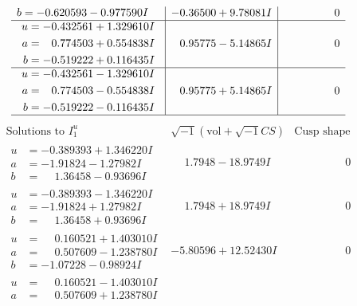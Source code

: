 \documentclass[1p]{elsarticle_modified}
\theoremstyle{definition}
\newcommand{\I}{\sqrt{-1}}
\begin{document}
$$\begin{array}{c|c|c}
\begin{aligned}
b &= -0.620593 - 0.977590 I\end{aligned}
 & -0.36500 + 9.78081 I & \phantom{-0.000000 } 0 \\ \hline\begin{aligned}
u &= -0.432561 + 1.329610 I \\
a &= \phantom{-}0.774503 + 0.554838 I \\
b &= -0.519222 + 0.116435 I\end{aligned}
 & \phantom{-}0.95775 - 5.14865 I & \phantom{-0.000000 } 0 \\ \hline\begin{aligned}
u &= -0.432561 - 1.329610 I \\
a &= \phantom{-}0.774503 - 0.554838 I \\
b &= -0.519222 - 0.116435 I\end{aligned}
 & \phantom{-}0.95775 + 5.14865 I & \phantom{-0.000000 } 0\\
 \hline 
 \end{array}$$\newpage$$\begin{array}{c|c|c}  
\text{Solutions to }I^u_{1}& \I (\text{vol} + \sqrt{-1}CS) & \text{Cusp shape}\\
 \hline 
\begin{aligned}
u &= -0.389393 + 1.346220 I \\
a &= -1.91824 - 1.27982 I \\
b &= \phantom{-}1.36458 - 0.93696 I\end{aligned}
 & \phantom{-}1.7948 - 18.9749 I & \phantom{-0.000000 } 0 \\ \hline\begin{aligned}
u &= -0.389393 - 1.346220 I \\
a &= -1.91824 + 1.27982 I \\
b &= \phantom{-}1.36458 + 0.93696 I\end{aligned}
 & \phantom{-}1.7948 + 18.9749 I & \phantom{-0.000000 } 0 \\ \hline\begin{aligned}
u &= \phantom{-}0.160521 + 1.403010 I \\
a &= \phantom{-}0.507609 - 1.238780 I \\
b &= -1.07228 - 0.98924 I\end{aligned}
 & -5.80596 + 12.52430 I & \phantom{-0.000000 } 0 \\ \hline\begin{aligned}
u &= \phantom{-}0.160521 - 1.403010 I \\
a &= \phantom{-}0.507609 + 1.238780 I \\

\end{aligned}
\end{array}$$
\end{document}
